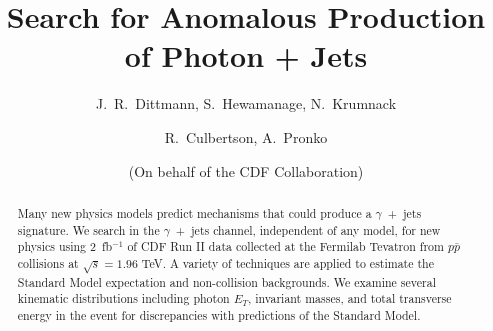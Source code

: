 \documentclass[slac_one]{revtex4}
\begin{document}
\def\sla#1{\rlap{\kern .15em /}#1}
\newcommand{\pt}{\mbox{$p_T$}\xspace}
\newcommand{\Ht}{\mbox{$H_T$}\xspace}
\newcommand{\et}{\mbox{$E_T$}\xspace}
\newcommand{\met}{\mbox{$\sla{E}_T$}\xspace}
\newcommand{\eoverp}{\mbox{$E/p$}\xspace}
\newcommand{\isoetcorr}{\mbox {$E_ {T}^{Iso(corr)}$\xspace }}
\newcommand{\phojets}{\mbox{$\gamma$ + jets}\xspace}
\newcommand{\phoonejet}{\mbox{$\gamma$ + $\geq$1 jet}\xspace}
\newcommand{\photwojet}{\mbox{$\gamma$ + $\geq$2 jets}\xspace}
\newcommand{\phojetsmet}{\mbox{\phojets + \met}\xspace}


\title{Search for Anomalous Production of Photon + Jets} %

%

\author{J.~R.~Dittmann, S.~Hewamanage, N.~Krumnack}
%
\author{R.~Culbertson, A.~Pronko}

\author{(On  behalf of the CDF Collaboration)}
\noaffiliation

\begin{abstract}
Many new physics models predict mechanisms that could produce a \phojets signature.  We search in the
\phojets channel, independent of any model, for new physics using 2~fb$^{-1}$  of CDF Run II data collected at the Fermilab Tevatron from $p\bar{p}$ collisions
at $\sqrt{s} = 1.96$ TeV. A variety of techniques are applied to estimate the Standard Model expectation and non-collision backgrounds. We examine several
kinematic distributions including photon $E_T$, invariant masses, and total transverse energy in the event for discrepancies with predictions of the Standard Model.
\end{abstract}

\maketitle

\thispagestyle{fancy}
\end{document}
